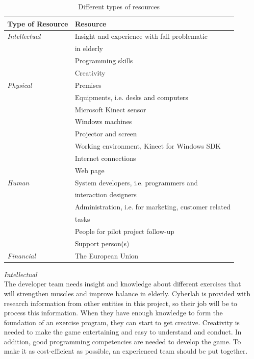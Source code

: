 \begin{table}
\centering
    \begin{tabular}{|l|l|}
        \hline
       \textbf{Type of Resource} & \textbf{Resource}  \\ \hline
       \emph{Intellectual} & Insight and experience with fall problematic \\ & in elderly \\ \cline{2-2}
        & Programming skills \\ \cline{2-2}
	 	& Creativity \\ \hline
	   \emph{Physical} & Premises \\ \cline{2-2}
	   	& Equipments, i.e. desks and computers  \\ \cline{2-2}
	   	& Microsoft Kinect sensor \\ \cline{2-2}
	   	& Windows machines \\ \cline{2-2}
	   	& Projector and screen \\ \cline{2-2}
	   	& Working environment, Kinect for Windows SDK \\ \cline{2-2}
	   	& Internet connections \\ \cline{2-2}
	   	& Web page \\ \hline
	   \emph{Human} & System developers, i.e. programmers and \\ & interaction designers \\ \cline{2-2}
	   	& Administration, i.e. for marketing, customer related \\ &tasks \\ \cline{2-2}
	   	&  People for pilot project follow-up \\ \cline{2-2}
	   	& Support person(s) \\ \hline
	   \emph{Financial} & The European Union \\
        \hline
    \end{tabular}
    \caption[Resources]{Different types of resources}
    \label{tab:Resources}
\end{table} 
\emph{Intellectual} \\ The developer team needs insight and knowledge about different exercises that will strengthen muscles and improve balance in elderly. Cyberlab is provided with research information from other entities in this project, so their job will be to process this information. When they have enough knowledge to form the foundation of an exercise program, they can start to get creative. Creativity is needed to make the game entertaining and easy to understand and conduct. In addition, good programming competencies are needed to develop the game. To make it as cost-efficient as possible, an experienced team should be put together. \\ \\
